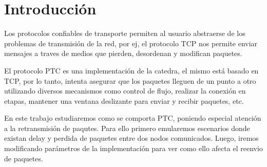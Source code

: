 \section{Introducci\'on}
    
    Los protocolos confiables de transporte permiten al usuario abstraerse 
    de los problemas de transmisi\'on de la red, por ej, el protocolo TCP 
    nos permite enviar mensajes a traves de medios que pierden, desordenan
    y modifican paquetes. 
    
    El protocolo PTC es una implementaci\'on de la catedra, el mismo est\'a 
    basado en TCP, por lo tanto, intenta asegurar que los paquetes lleguen de un
    punto a otro utilizando diversos mecanismos como control de flujo, realizar
    la conexi\'on en etapas, mantener una ventana deslizante para enviar 
    y recibir paquetes, etc. 
        
    En este trabajo estudiaremos como se comporta PTC, poniendo especial 
    atenci\'on a la retransmisi\'on de paqutes. Para ello 
    primero emularemos escenarios donde existan delay y perdida
    de paquetes entre dos nodos comunicados. Luego, iremos modificando
    par\'ametros de la implementaci\'on para ver como ello afecta el reenvio 
    de paquetes. 

